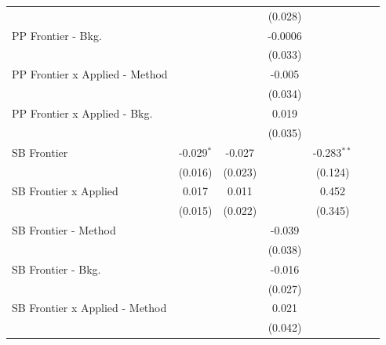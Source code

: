 \begin{tabular}{lcccccc}
                                  &               &               & (0.028)       &               &        &   \\   
   PP Frontier - Bkg.             &               &               & -0.0006       &               &        &   \\   
                                  &               &               & (0.033)       &               &        &   \\   
   PP Frontier x Applied - Method &               &               & -0.005        &               &        &   \\   
                                  &               &               & (0.034)       &               &        &   \\   
   PP Frontier x Applied - Bkg.   &               &               & 0.019         &               &        &   \\   
                                  &               &               & (0.035)       &               &        &   \\   
   SB Frontier                    & -0.029$^{*}$  & -0.027        &               & -0.283$^{**}$ &        &   \\   
                                  & (0.016)       & (0.023)       &               & (0.124)       &        &   \\   
   SB Frontier x Applied          & 0.017         & 0.011         &               & 0.452         &        &   \\   
                                  & (0.015)       & (0.022)       &               & (0.345)       &        &   \\   
   SB Frontier - Method           &               &               & -0.039        &               &        &   \\   
                                  &               &               & (0.038)       &               &        &   \\   
   SB Frontier - Bkg.             &               &               & -0.016        &               &        &   \\   
                                  &               &               & (0.027)       &               &        &   \\   
   SB Frontier x Applied - Method &               &               & 0.021         &               &        &   \\   
                                  &               &               & (0.042)       &               &        &   \\   

\end{tabular}
